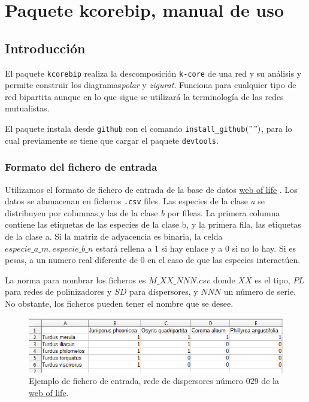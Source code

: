 
\appendix
\renewcommand{\thechapter}{B}
\chapter{Paquete kcorebip, manual de uso} %

\label{APP_KCOREMANBIP} %

\section*{Introducción}

El paquete \texttt{kcorebip} realiza la descomposición \texttt{k-core} de una red y su análisis y permite construir los diagramas\textit{polar}
y \textit{zigurat}. Funciona para cualquier tipo de red bipartita aunque en lo que sigue se utilizará la terminología de las redes mutualistas.

El paquete instala desde \texttt{github} con el comando \texttt{install\_github}$("$$")$, para lo cual previamente se tiene que cargar el paquete \texttt{devtools}.
 
\subsection*{Formato del fichero de entrada}
\label{input_file_format}

Utilizamos el formato de fichero de entrada de la base de datos \href{http://www.web-of-life.es/}{web of life} \cite{bascompte2009}. Los datos se alamacenan en ficheros \texttt{.csv} files. Las especies de la clase \textit{a} se distribuyen por columnas,y las de la clase \textit{b} por fileas. La primera columna contiene las etiquetas de las especies de la clase b, y la primera fila, las etiquetas de la clase a. Si la matriz de adyacencia es binaria, la celda $especie\_a\_m,especie\_b\_n$ estará rellena a $1$ si hay enlace y a $0$ si no lo hay. Si es pesas, a un numero real diferente de $0$ en el caso de que las especies interactúen.

La norma para nombrar los ficheros es $M\_XX\_NNN.csv$ donde $XX$ es el tipo, $PL$ para redes de polinizadores y $SD$ para dispersores, y $NNN$ un número de serie. No obstante, los ficheros pueden tener el nombre que se desee.

\begin{figure}[h!]
\centering
\includegraphics[scale=0.8]{ManFigs/SD_029_csv.png}
\caption {Ejemplo de fichero de entrada, rede de dispersores número $029$ de la \href{http://www.web-of-life.es/}{web of life}.}
\label{fig:AKMAN_red_example}
\end{figure}

